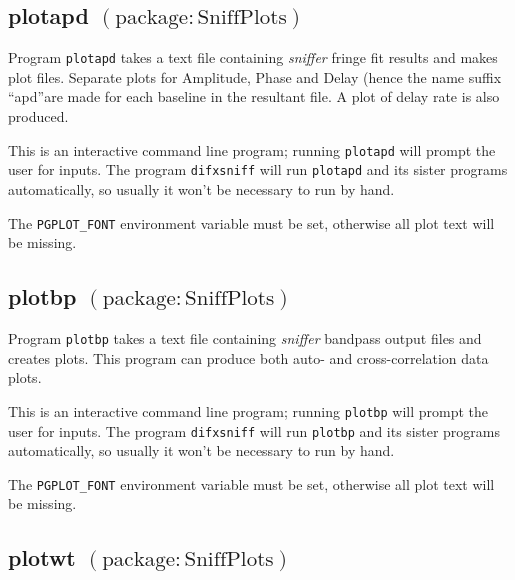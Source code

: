 
\subsection{plotapd {\small $\mathrm{(package: SniffPlots)}$} \label{sec:plotapd}}

Program {\tt plotapd} takes a text file containing {\em sniffer} fringe fit results and makes plot files.
Separate plots for Amplitude, Phase and Delay (hence the name suffix ``apd''are made for each baseline in the resultant file.
A plot of delay rate is also produced.

This is an interactive command line program; running {\tt plotapd} will prompt the user for inputs.
The program {\tt difxsniff} will run {\tt plotapd} and its sister programs automatically, so usually it won't be necessary to run by hand.

The {\tt PGPLOT\_FONT} environment variable must be set, otherwise all plot text will be missing.






\subsection{plotbp {\small $\mathrm{(package: SniffPlots)}$} \label{sec:plotbp}}

Program {\tt plotbp} takes a text file containing {\em sniffer} bandpass output files and creates plots.
This program can produce both auto- and cross-correlation data plots.

This is an interactive command line program; running {\tt plotbp} will prompt the user for inputs.
The program {\tt difxsniff} will run {\tt plotbp} and its sister programs automatically, so usually it won't be necessary to run by hand.

The {\tt PGPLOT\_FONT} environment variable must be set, otherwise all plot text will be missing.






\subsection{plotwt {\small $\mathrm{(package: SniffPlots)}$} \label{sec:plotwt}}

